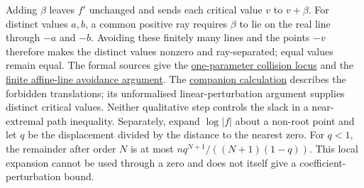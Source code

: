 \documentclass[11pt]{article}
\newcommand{\recordlink}[3]{\href{#1\##2}{#3}}
\begin{document}
\noindent{}\label{res:locus}
Adding $\beta$ leaves $f'$ unchanged and sends each critical value $v$
to $v+\beta$. For distinct values $a,b$, a common positive ray requires
$\beta$ to lie on the real line through $-a$ and $-b$.
Avoiding these finitely many lines and the points $-v$ therefore makes
the distinct values nonzero and ray-separated; equal values remain equal.
The formal sources give the
\href{https://github.com/wcook04/plectis-erdos/blob/7380b7871687b6bcc41ca0143c61f232e8af6500/lean/ErdosProblems/Erdos1041/NewtonFlowRaySeparation.lean\#L107}{one-parameter collision locus}
and the \href{https://github.com/wcook04/plectis-erdos/blob/7380b7871687b6bcc41ca0143c61f232e8af6500/lean/ErdosProblems/Erdos1041/NewtonFlowRaySeparation.lean\#L162}{finite affine-line avoidance argument}.
The \recordlink{erdos1041-lemniscate-reasoning-surface.pdf}{argument-perturbation-proof}
{companion calculation} describes the forbidden translations; its
unformalised linear-perturbation argument supplies distinct critical values.
Neither qualitative step controls the slack in a near-extremal path inequality.
Separately, expand $\log|f|$ about a non-root point and let $q$ be the
displacement divided by the distance to the nearest zero. For $q<1$,
the remainder after order $N$ is at most $nq^{N+1}/((N+1)(1-q))$.
This local expansion cannot be used through a zero and does not itself
give a coefficient-perturbation bound.
\end{document}
